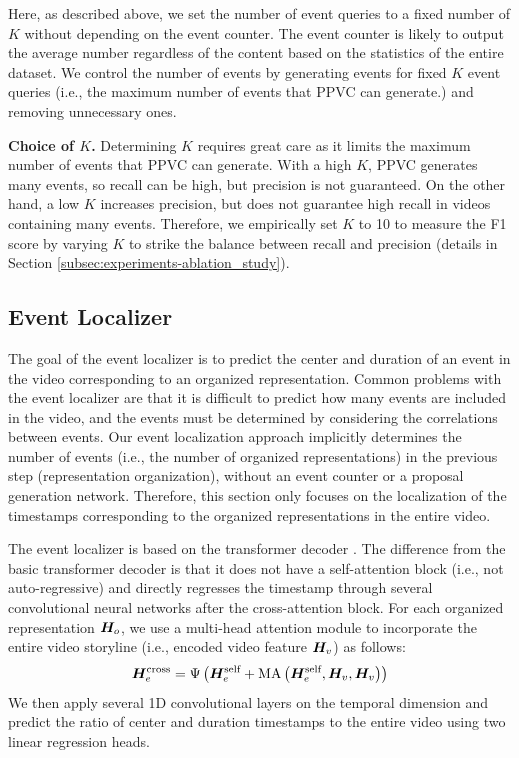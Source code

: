 Here, as described above, we set the number of event queries to a fixed number of $K$ without depending on the event counter.
The event counter is likely to output the average number regardless of the content based on the statistics of the entire dataset.
We control the number of events by generating events for fixed $K$ event queries (i.e., the maximum number of events that PPVC can generate.) and removing unnecessary ones.

\textbf{Choice of $K$.}
Determining $K$ requires great care as it limits the maximum number of events that PPVC can generate.
With a high $K$, PPVC generates many events, so recall can be high, but precision is not guaranteed. 
On the other hand, a low $K$ increases precision, but does not guarantee high recall in videos containing many events.
Therefore, we empirically set $K$ to 10 to measure the F1 score by varying $K$ to strike the balance between recall and precision (details in Section \ref{subsec:experiments-ablation_study}).

\subsection{Event Localizer}
\label{subsec:method_event_localizer}
The goal of the event localizer is to predict the center and duration of an event in the video corresponding to an organized representation.
Common problems with the event localizer are that it is difficult to predict how many events are included in the video, and the events must be determined by considering the correlations between events.
Our event localization approach implicitly determines the number of events (i.e., the number of organized representations) in the previous step (representation organization), without an event counter or a proposal generation network.
Therefore, this section only focuses on the localization of the timestamps corresponding to the organized representations in the entire video.

The event localizer is based on the transformer decoder \cite{vaswani2017attention}.
The difference from the basic transformer decoder is that it does not have a self-attention block (i.e., not auto-regressive) and directly regresses the timestamp through several convolutional neural networks after the cross-attention block.
For each organized representation $\bm{H}_o$, we use a multi-head attention module to incorporate the entire video storyline (i.e., encoded video feature $\bm{H}_v$) as follows:
\begin{equation}
  \bm{H}_e^{\text{cross}} = \Psi \left( \bm{H}_e^{\text{self}} + \text{MA} \left( \bm{H}_e^{\text{self}}, \bm{H}_{v}, \bm{H}_{v} \right) \right)
  \label{eq:event_localizer_cross_attention}
\end{equation}
We then apply several 1D convolutional layers on the temporal dimension and predict the ratio of center and duration timestamps to the entire video using two linear regression heads.

